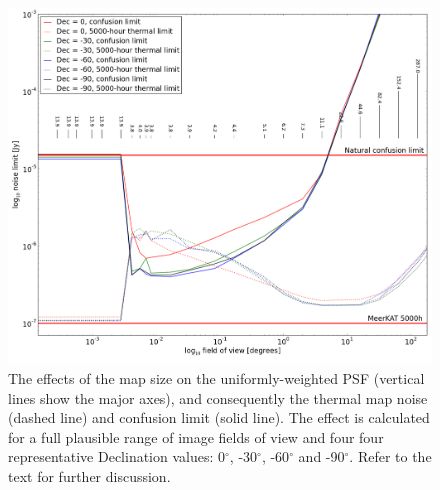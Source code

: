 \documentclass{aa}
\begin{document}
\begin{figure}
\centering
\includegraphics[width = \columnwidth]{uniform_confusion}
\caption{The effects of the map size on the uniformly-weighted PSF (vertical lines show the major axes), and consequently the thermal map noise (dashed line) and confusion limit (solid line). The effect is calculated for a full plausible range of image fields of view and four four representative Declination values: 0$^{\circ}$, -30$^{\circ}$, -60$^{\circ}$ and -90$^{\circ}$. Refer to the text for further discussion.\label{fig:uniform_confusion}}
\end{figure}

% 
% 
% 
% 
% 
\end{document}
